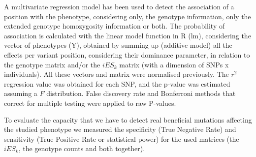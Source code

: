 \documentclass[a4paper,11pt]{article}
\begin{document}

A  multivariate regression model has been used to detect the association of a position with the phenotype, considering only, the genotype information, only the extended genotype homozygosity information or both. The probability of association is calculated with the linear model function in R (lm), considering the vector of phenotypes (Y), obtained by summing up (additive model) all the effects per variant position, considering their dominance parameter, in relation to the genotype matrix and/or the ${iES_k}$ matrix  (with a dimension of SNPs x individuals). All these vectors and matrix were normalised previously. The $r^2$ regression value was obtained for each SNP, and the p-value was estimated assuming a $F$ distribution. False discovery rate and Bonferroni methods \citep{Benjamini:1995aa} that correct for multiple testing were applied to raw P-values. \par
To evaluate the capacity that we have to detect real beneficial mutations affecting the studied phenotype we measured the specificity (True Negative Rate) and sensitivity (True Positive Rate or statistical power) for the used matrices (the $iES_k$, the genotype counts and both together). %


\end{document}
